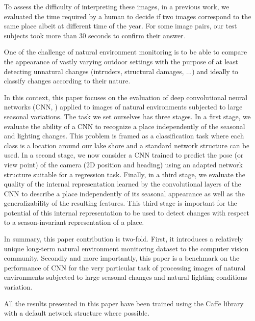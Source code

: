 To assess the difficulty of interpreting these images, in a
previous work, we evaluated the time required by a human to decide if two
images correspond to the same place albeit at different time of the year. For
some image pairs, our test subjects took more than 30 seconds to confirm their answer.  

One of the challenge of natural environment monitoring is to be able to compare
the appearance of vastly varying outdoor settings with the purpose of at least
detecting unnatural changes (intruders, structural damages, ...) and ideally to
classify changes according to their nature. 

In this context, this paper focuses on the evaluation of deep convolutional
neural networks (CNN, \cite{farabet-pami-13}) applied to images of natural environments
subjected to large seasonal variations. The task we set ourselves has three
stages. In a first stage, we evaluate the ability of a CNN to recognize a place
independently of the seasonal and lighting changes. This problem is framed as a
classification task where each class is a location around our lake shore and a
standard network structure can be used. In a
second stage, we now consider a CNN trained to predict the pose (or view point)
of the camera (2D position and heading) using an adapted network structure
suitable for a regression task. Finally, in a third stage, we evaluate the
quality of the internal representation learned by the convolutional layers of
the CNN to describe a place independently of its seasonal appearance as well as
the generalizability of the resulting features. This third stage is important
for the potential of this internal representation to be used to detect changes
with respect to a season-invariant representation of a place. 

In summary, this paper contribution is two-fold. First, it introduces a
relatively unique long-term natural environment monitoring dataset to the
computer vision community.  Secondly and more importantly, this paper is a
benchmark on the performance of CNN for the very particular task of processing
images of natural environments subjected to large seasonal changes and natural
lighting conditions variation. 

All the results presented in this paper have been trained using the Caffe
library~\cite{jia2014caffe} with a default network structure where possible.  

% 
